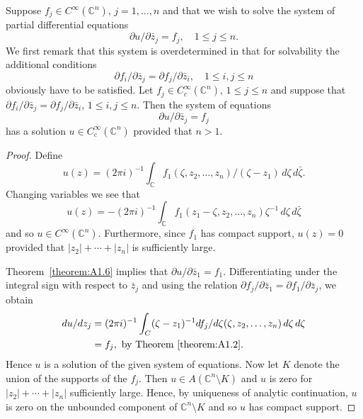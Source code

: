 Suppose $f_j\in C^\infty(\mathbb C^n)$, $j=1,\ldots,n$ and that we wish to solve the system of partial differential equations
\[\partial u/\partial\bar z_j=f_j,\quad 1\leq j\leq n.\]
We first remark that this system is overdetermined in that for solvability the additional conditions
\[\partial f_i/\partial\bar z_j=\partial f_j/\partial\bar z_i,\quad 1\leq i,j\leq n\]
obviously have to be satisfied.
 Let $f_j\in C_c^\infty(\mathbb C^n)$, $1\leq j\leq n$ and suppose that $\partial f_i/\partial\bar z_j=\partial f_j/\partial\bar z_i$, $1\leq i,j\leq n$. Then the system of equations
\[\partial u/\partial\bar z_j=f_j\]
has a solution $u\in C_c^\infty(\mathbb C^n)$ provided that $n>1$.
\begin{proof}
Define
\[u(z)=(2\pi i)^{-1}\int_{\mathbb C}f_1(\zeta,z_2,\ldots,z_n)/(\zeta-z_1)\,d\zeta\,d\bar\zeta.\]
Changing variables we see that
\[u(z)=-(2\pi i)^{-1}\int_{\mathbb C}f_1(z_1-\zeta,z_2,\ldots,z_n)\zeta^{-1}\,d\zeta\,d\bar\zeta\]
and so $u\in C^\infty(\mathbb C^n)$. Furthermore, since $f_1$ has compact support, $u(z)=0$ provided that $|z_2|+\cdots+|z_n|$ is sufficiently large.

Theorem~\ref{theorem:A1.6} implies that $\partial u/\partial\bar z_1=f_1$. Differentiating under the integral sign with respect to $\bar z_j$ and using the relation $\partial f_j/\partial\bar z_1=\partial f_1/\partial\bar z_j$, we obtain
\begin{align*}
\partial u/\partial\bar z_j&=(2\pi i)^{-1}\int_{\mathbb C}(\zeta-z_1)^{-1}\partial f_j/\partial\bar\zeta(\zeta,z_2,\ldots,z_n)\,d\zeta\,d\bar\zeta\\
&=f_j,\text{ by Theorem~\ref{theorem:A1.2}.}
\end{align*}
Hence $u$ is a solution of the given system of equations. Now let $K$ denote the union of the supports of the $f_j$. Then $u\in A(\mathbb C^n\setminus K)$ and $u$
is zero for $|z_2|+\cdots+|z_n|$ sufficiently large. Hence, by uniqueness of analytic continuation, $u$ is zero on the unbounded component of $\mathbb C^n\setminus K$ and so $u$ has compact support.
\end{proof}
